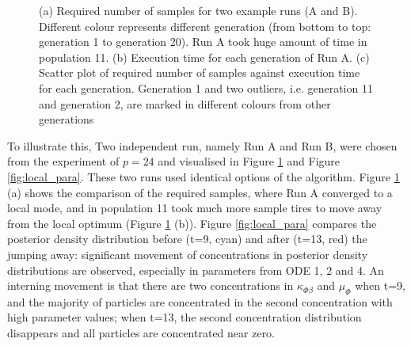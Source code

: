 \begin{figure}[ht!]
    \begin{center}
    \end{center}

    \caption[Local optimum and abnormal pattern]{(a) Required number of samples for two example runs (A and B). Different colour represents different generation (from bottom to top: generation 1 to generation 20). Run A took huge amount of time in population 11. (b) Execution time for each generation of Run A. (c) Scatter plot of required number of samples against execution time for each generation. Generation 1 and two outliers, i.e. generation 11 and generation 2, are marked in different colours from other generations}
    \label{fig:local_modes}
\end{figure}

To illustrate this, Two independent run, namely Run A and Run B, were chosen from the experiment of $p=24$ and visualised in Figure \ref{fig:local_modes} and Figure \ref{fig:local_para}. These two runs used identical options of the algorithm. Figure \ref{fig:local_modes} (a) shows the comparison of the required samples, where Run A converged to a local mode, and in population 11 took much more sample tires to move away from the local optimum (Figure \ref{fig:local_modes} (b)). Figure \ref{fig:local_para} compares the posterior density distribution before (t=9, cyan) and after (t=13, red) the jumping away: significant movement of concentrations in posterior density distributions are observed, especially in parameters from ODE 1, 2 and 4. An interning movement is that there are two concentrations in $\kappa_{\Phi\beta}$ and $\mu_\Phi$ when t=9, and the majority of particles are concentrated in the second concentration with high parameter values; when t=13, the second concentration distribution disappears and all particles are concentrated near zero.

